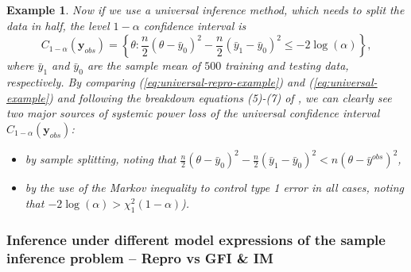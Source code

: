 \documentclass[12pt]{article}
\theoremstyle{shortspace}
\newtheorem{example}{\quad Example}
\begin{document}
\begin{example}
 
Now if we use a universal inference method, which needs to split the data in half, the level $1 - \alpha$ confidence interval is 
\begin{equation}
  \label{eq:universal-example}
C_{1 - \alpha}(\mathbf{y}_{obs}) = \left\{\theta: \frac{n}2(\theta - \bar y_0)^2 - \frac{n}2(\bar y_1 - \bar y_0)^2 \leq  - 2\log(\alpha)\right\},
 \end{equation}
 where $\bar y_1$ and $\bar y_0$ are the sample mean of $500$ training and testing data, respectively.  By comparing (\ref{eq:universal-repro-example}) and (\ref{eq:universal-example}) and following the breakdown equations (5)-(7)
of \cite{TseDavison2023},  
we can clearly see two major sources of systemic power loss of the universal confidence interval $C_{1 - \alpha}(\mathbf{y}_{obs})$:
\begin{itemize}
[leftmargin=1.5em, labelsep=1.5em, 
align=parleft,   itemsep=0pt,
  parsep=0pt,
  topsep=0pt] 
\item[(a)] by sample splitting, noting that $\frac{n}2(\theta - \bar y_0)^2 - \frac{n}2(\bar y_1 - \bar y_0)^2 < n(\theta - \bar y^{obs})^2$,
\item[(b)] by the use of the
Markov inequality to control type 1 error in all cases, noting that $-2\log(\alpha) >  \chi_1^2(1 - \alpha)$). 
\end{itemize}


   
\end{example} 




\subsubsection{Inference under different model expressions of the sample inference problem -- Repro vs GFI \& IM} \label{sec:App-G-unique-example}
\end{document}
